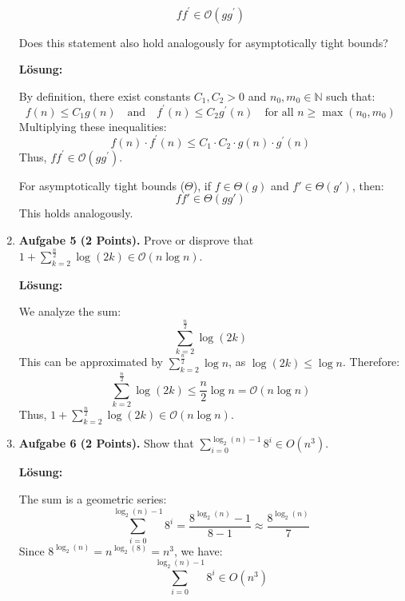 \documentclass[11pt]{article}
\begin{document}
\begin{enumerate}
	      \[
		      f f^{\prime} \in \mathcal{O}\left(g g^{\prime}\right)
	      \]

	      Does this statement also hold analogously for asymptotically tight bounds?

	      \textbf{Lösung:}

	      By definition, there exist constants \(C_1, C_2 > 0\) and \(n_0, m_0 \in \mathbb{N}\) such that:
	      \[
		      f(n) \leq C_1 g(n) \quad \text{and} \quad f^{\prime}(n) \leq C_2 g^{\prime}(n) \quad \text{for all } n \geq \max(n_0, m_0)
	      \]
	      Multiplying these inequalities:
	      \[
		      f(n) \cdot f^{\prime}(n) \leq C_1 \cdot C_2 \cdot g(n) \cdot g^{\prime}(n)
	      \]
	      Thus, \(f f^{\prime} \in \mathcal{O}(g g^{\prime})\).

	      For asymptotically tight bounds (\(\Theta\)), if \(f \in \Theta(g)\) and \(f' \in \Theta(g')\), then:
	      \[
		      f f' \in \Theta(g g')
	      \]
	      This holds analogously.

	\item
	      \textbf{Aufgabe 5 (2 Points).} Prove or disprove that \(1+\sum_{k=2}^{\frac{n}{2}} \log(2k) \in \mathcal{O}(n \log n)\).

	      \textbf{Lösung:}

	      We analyze the sum:
	      \[
		      \sum_{k=2}^{\frac{n}{2}} \log(2k)
	      \]
	      This can be approximated by \(\sum_{k=2}^{\frac{n}{2}} \log n\), as \(\log(2k) \leq \log n\). Therefore:
	      \[
		      \sum_{k=2}^{\frac{n}{2}} \log(2k) \leq \frac{n}{2} \log n = \mathcal{O}(n \log n)
	      \]
	      Thus, \(1+\sum_{k=2}^{\frac{n}{2}} \log(2k) \in \mathcal{O}(n \log n)\).

	\item
	      \textbf{Aufgabe 6 (2 Points).} Show that \(\sum_{i=0}^{\log_2(n)-1} 8^i \in O\left(n^3\right)\).

	      \textbf{Lösung:}

	      The sum is a geometric series:
	      \[
		      \sum_{i=0}^{\log_2(n)-1} 8^i = \frac{8^{\log_2(n)} - 1}{8 - 1} \approx \frac{8^{\log_2(n)}}{7}
	      \]
	      Since \(8^{\log_2(n)} = n^{\log_2(8)} = n^3\), we have:
	      \[
		      \sum_{i=0}^{\log_2(n)-1} 8^i \in O(n^3)
	      \]

\end{enumerate}
\end{document}
